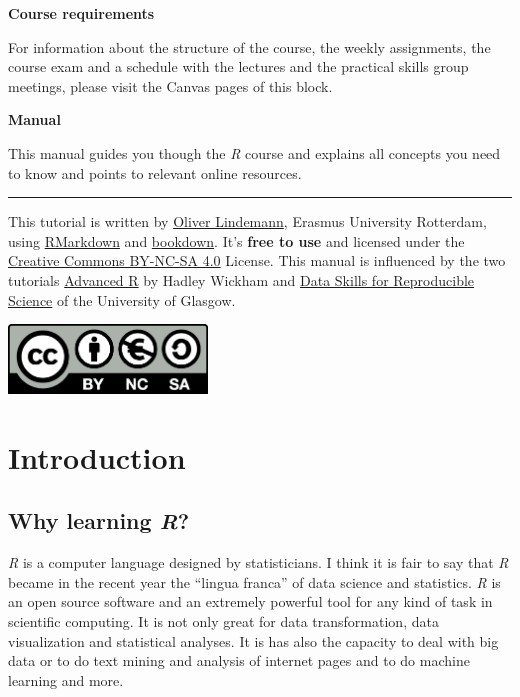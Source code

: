 \documentclass[
]{scrartcl}
\begin{document}
\textbf{Course requirements}

For information about the structure of the course, the weekly assignments, the course exam and a schedule with the lectures and the practical skills group meetings, please visit the Canvas pages of this block.

\textbf{Manual}

This manual guides you though the \emph{R} course and explains all concepts you need to know and points to relevant online resources.

\vfill

\begin{center}\rule{0.5\linewidth}{0.5pt}\end{center}

This tutorial is written by \href{http://cognitive-psychology.eu/lindemann}{Oliver Lindemann}, Erasmus University Rotterdam, using \href{https://rmarkdown.rstudio.com/}{RMarkdown} and \href{https://bookdown.org/}{bookdown}. It's \textbf{free to use} and licensed under the \href{https://creativecommons.org/licenses/by-nc-sa/4.0/}{Creative Commons BY-NC-SA 4.0} License. This manual is influenced by the two tutorials \href{https://r4ds.had.co.nz/index.html}{Advanced R} by Hadley Wickham and \href{https://psyteachr.github.io/msc-data-skills/}{Data Skills for Reproducible Science} of the University of Glasgow.

\begin{center}\includegraphics[width=200px]{images/by-nc-sa.eu_} \end{center}

\newpage

\newpage

\section{Introduction}\label{introduction}

\subsection{\texorpdfstring{Why learning \emph{R}?}{Why learning R?}}\label{why-learning-r}

\emph{R} is a computer language designed by statisticians. I think it is fair to say that \emph{R} became in the recent year the ``lingua franca'' of data science and statistics. \emph{R} is an open source software and an extremely powerful tool for any kind of task in scientific computing. It is not only great for data transformation, data visualization and statistical analyses. It is has also the capacity to deal with big data or to do text mining and analysis of internet pages and to do machine learning and more.
\end{document}
